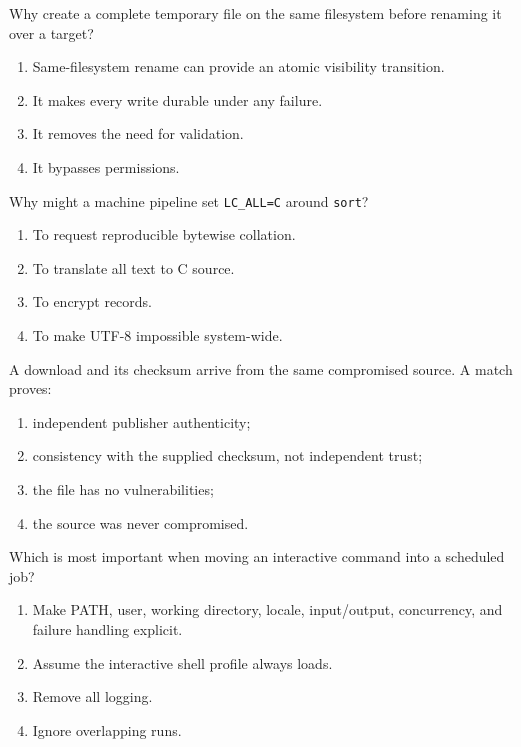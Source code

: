 \documentclass[11pt,oneside,openany]{book}
\newcommand{\fourchoices}[4]{%
  \begin{enumerate}[label=\Alph*),leftmargin=2em,itemsep=0.25em]
    \item #1
    \item #2
    \item #3
    \item #4
  \end{enumerate}}
\begin{document}
\begin{questionbox}[title={Hard 37 -- Atomic replacement}]
Why create a complete temporary file on the same filesystem before renaming it over a target?
\fourchoices{Same-filesystem rename can provide an atomic visibility transition.}{It makes every write durable under any failure.}{It removes the need for validation.}{It bypasses permissions.}
\end{questionbox}

\begin{questionbox}[title={Hard 38 -- Locale}]
Why might a machine pipeline set \texttt{LC\_ALL=C} around \texttt{sort}?
\fourchoices{To request reproducible bytewise collation.}{To translate all text to C source.}{To encrypt records.}{To make UTF-8 impossible system-wide.}
\end{questionbox}

\begin{questionbox}[title={Hard 39 -- Checksum trust}]
A download and its checksum arrive from the same compromised source. A match proves:
\fourchoices{independent publisher authenticity;}{consistency with the supplied checksum, not independent trust;}{the file has no vulnerabilities;}{the source was never compromised.}
\end{questionbox}

\begin{questionbox}[title={Hard 40 -- Automation context}]
Which is most important when moving an interactive command into a scheduled job?
\fourchoices{Make PATH, user, working directory, locale, input/output, concurrency, and failure handling explicit.}{Assume the interactive shell profile always loads.}{Remove all logging.}{Ignore overlapping runs.}
\end{questionbox}
\end{document}
